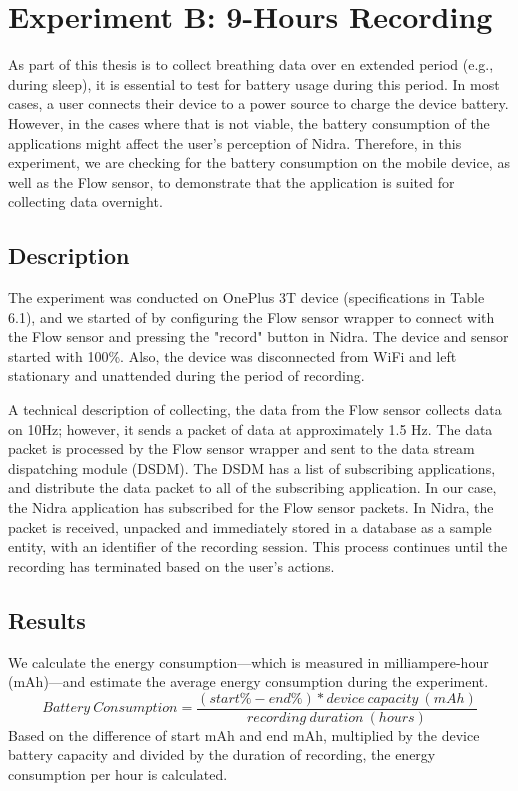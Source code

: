 \section{Experiment B: 9-Hours Recording}
As part of this thesis is to collect breathing data over en extended period (e.g., during sleep), it is essential to test for battery usage during this period. In most cases, a user connects their device to a power source to charge the device battery. However, in the cases where that is not viable, the battery consumption of the applications might affect the user's perception of Nidra. Therefore, in this experiment, we are checking for the battery consumption on the mobile device, as well as the Flow sensor, to demonstrate that the application is suited for collecting data overnight.

\subsection{Description}
The experiment was conducted on OnePlus 3T device (specifications in Table 6.1), and we started of by configuring the Flow sensor wrapper to connect with the Flow sensor and pressing the "record" button in Nidra. The device and sensor started with 100\%. Also, the device was disconnected from WiFi and left stationary and unattended during the period of recording.  

A technical description of collecting, the data from the Flow sensor collects data on 10Hz; however, it sends a packet of data at approximately 1.5 Hz. The data packet is processed by the Flow sensor wrapper and sent to the data stream dispatching module (DSDM). The DSDM has a list of subscribing applications, and distribute the data packet to all of the subscribing application. In our case, the Nidra application has subscribed for the Flow sensor packets. In Nidra, the packet is received, unpacked and immediately stored in a database as a sample entity, with an identifier of the recording session. This process continues until the recording has terminated based on the user's actions.

\subsection{Results}

We calculate the energy consumption---which is measured in milliampere-hour (mAh)---and estimate the average energy consumption during the experiment. 
\begin{equation} \label{losscount}
Battery\ Consumption = \frac{(start\% - end\%) * device\ capacity\ (mAh)}{recording\ duration\ (hours)}
\end{equation}
Based on the difference of start mAh and end mAh, multiplied by the device battery capacity and divided by the duration of recording, the energy consumption per hour is calculated. 

